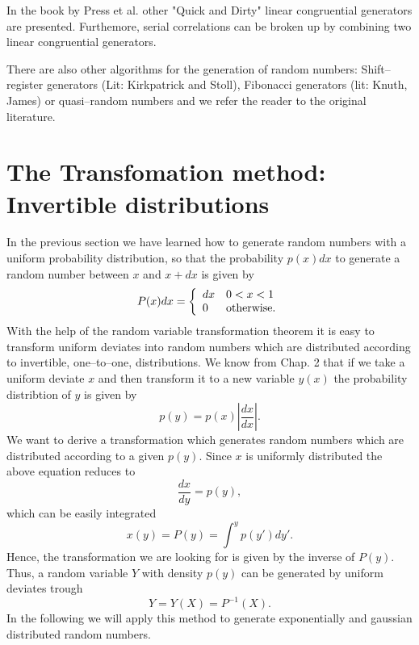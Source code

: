 In the book by Press et al. other "Quick and Dirty" linear 
congruential generators
are presented. Furthemore, serial correlations can be broken up by 
combining two linear congruential generators.

There are also other algorithms for the generation of random 
numbers: Shift--register generators (Lit: Kirkpatrick and Stoll), 
Fibonacci generators (lit: Knuth, James) or quasi--random numbers 
and we refer the reader to the original literature.

\section{The Transfomation method: Invertible distributions}
In the previous section we have learned how to generate random 
numbers with a uniform probability distribution, so that the 
probability $p(x)dx$ to generate a random number between $x$ and $x+dx$
is given by
\begin{equation*}
P(x)dx = \left\{ \begin{array}{ll}
                   dx & 0<x<1 \\
                   0   & {\rm otherwise}.
                  \end{array}
         \right.
\end{equation*}
With the help of the random variable transformation theorem it is easy
to transform uniform deviates into random numbers which are 
distributed according to invertible, one--to--one, distributions.
We know from Chap. 2 that if we take a uniform deviate $x$ and then 
transform it to a new variable $y(x)$ the probability distribtion
of $y$ is given by
\begin{equation}
p(y) = p(x) \left| \frac{dx}{dx}\right|.
\end{equation}
We want to derive a transformation which generates random numbers 
which are distributed according to a given
$p(y)$. Since $x$ is uniformly distributed the 
above equation reduces to
\begin{equation}
\label{INVERTIBLE}
\frac{dx}{dy} = p(y),
\end{equation}
which can be easily integrated
\begin{equation*}
x(y) = P(y) = \int^y p(y')dy'.
\end{equation*}
Hence, the transformation we are looking for is given by the 
inverse of $P(y)$. Thus, a random variable $Y$ with density $p(y)$
can be generated by uniform deviates trough
\begin{equation*}
Y = Y(X) = P^{-1}(X).
\end{equation*}
In the following we will apply this method to generate 
exponentially and gaussian distributed random numbers.

